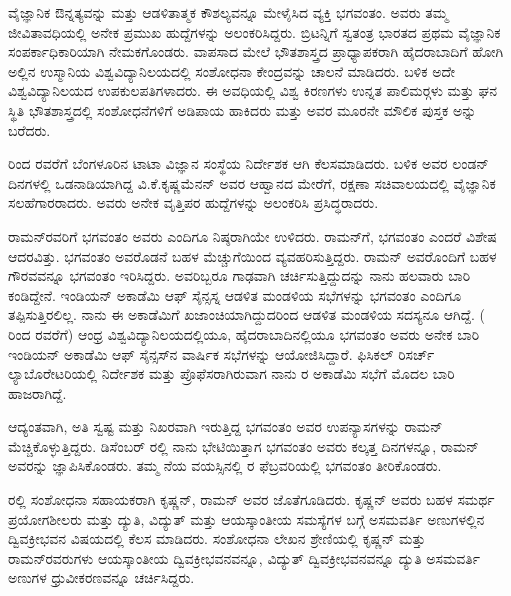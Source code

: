 \vskip 1pt

ವೈಜ್ಞಾನಿಕ ಔನ್ನತ್ಯವನ್ನು ಮತ್ತು ಆಡಳಿತಾತ್ಮಕ ಕೌಶಲ್ಯವನ್ನೂ ಮೇಳೈಸಿದ ವ್ಯಕ್ತಿ ಭಗವಂತಂ. ಅವರು ತಮ್ಮ ಜೀವಿತಾವಧಿಯಲ್ಲಿ ಅನೇಕ ಪ್ರಮುಖ ಹುದ್ದೆಗಳನ್ನು ಅಲಂಕರಿಸಿದ್ದರು. ಬ್ರಿಟನ್ನಿಗೆ ಸ್ವತಂತ್ರ ಭಾರತದ ಪ್ರಥಮ ವೈಜ್ಞಾನಿಕ ಸಂಪರ್ಕಾಧಿಕಾರಿಯಾಗಿ ನೇಮಕಗೊಂಡರು. ವಾಪಸಾದ ಮೇಲೆ ಭೌತಶಾಸ್ತ್ರದ ಪ್ರಾಧ್ಯಾಪಕರಾಗಿ ಹೈದರಾಬಾದಿಗೆ ಹೋಗಿ ಅಲ್ಲಿನ ಉಸ್ಮಾನಿಯ ವಿಶ್ವವಿದ್ಯಾ\-ನಿಲಯದಲ್ಲಿ ಸಂಶೋಧನಾ ಕೇಂದ್ರವನ್ನು ಚಾಲನೆ ಮಾಡಿದರು. ಬಳಿಕ ಅದೇ ವಿಶ್ವವಿದ್ಯಾನಿಲಯದ ಉಪಕುಲಪತಿಗಳಾದರು. ಈ ಅವಧಿಯಲ್ಲಿ ವಿಶ್ವ ಕಿರಣಗಳು ಉನ್ನತ ಪಾಲಿಮರ್‍ಗಳು ಮತ್ತು ಘನ ಸ್ಥಿತಿ ಭೌತಶಾಸ್ತ್ರದಲ್ಲಿ ಸಂಶೋಧನೆಗಳಿಗೆ ಅಡಿಪಾಯ ಹಾಕಿದರು ಮತ್ತು ಅವರ ಮೂರನೇ ಮೌಲಿಕ ಪುಸ್ತಕ \textit{} ಅನ್ನು ಬರೆದರು. 

\vskip 1pt

 ರಿಂದ  ರವರೆಗೆ ಬೆಂಗಳೂರಿನ ಟಾಟಾ ವಿಜ್ಞಾನ ಸಂಸ್ಥೆಯ ನಿರ್ದೇಶಕ ಆಗಿ ಕೆಲಸಮಾಡಿದರು. ಬಳಿಕ ಅವರ ಲಂಡನ್ ದಿನಗಳಲ್ಲಿ ಒಡನಾಡಿಯಾಗಿದ್ದ ವಿ.ಕೆ.ಕೃಷ್ಣಮೆನನ್ ಅವರ ಆಹ್ವಾನದ ಮೇರೆಗೆ, ರಕ್ಷಣಾ ಸಚಿವಾಲಯದಲ್ಲಿ ವೈಜ್ಞಾನಿಕ ಸಲಹೆಗಾರರಾದರು. ಅವರು ಅನೇಕ ವೃತ್ತಿಪರ ಹುದ್ದೆಗಳನ್ನು ಅಲಂಕರಿಸಿ ಪ್ರಸಿದ್ಧರಾದರು.

ರಾಮನ್‍ರವರಿಗೆ ಭಗವಂತಂ ಅವರು ಎಂದಿಗೂ ನಿಷ್ಠರಾಗಿಯೇ ಉಳಿದರು. ರಾಮನ್‍ಗೆ, ಭಗವಂತಂ ಎಂದರೆ ವಿಶೇಷ ಆದರವಿತ್ತು. ಭಗವಂತಂ ಅವರೊಡನೆ ಬಹಳ ಮೆಚ್ಚುಗೆಯಿಂದ ವ್ಯವಹರಿಸುತ್ತಿದ್ದರು. ರಾಮನ್ ಅವರೊಂದಿಗೆ ಬಹಳ ಗೌರವವನ್ನೂ ಭಗವಂತಂ ಇರಿಸಿದ್ದರು. ಅವರಿಬ್ಬರೂ ಗಾಢವಾಗಿ ಚರ್ಚಿಸುತ್ತಿದ್ದುದನ್ನು ನಾನು ಹಲವಾರು ಬಾರಿ ಕಂಡಿದ್ದೇನೆ. ಇಂಡಿಯನ್ ಅಕಾಡೆಮಿ ಆಫ್ ಸೈನ್ಸಸ್ನ ಆಡಳಿತ ಮಂಡಳಿಯ ಸಭೆಗಳನ್ನು ಭಗವಂತಂ ಎಂದಿಗೂ ತಪ್ಪಿಸುತ್ತಿರಲಿಲ್ಲ. ನಾನು ಈ ಅಕಾಡೆಮಿಗೆ ಖಜಾಂಚಿಯಾಗಿದ್ದುದರಿಂದ ಆಡಳಿತ ಮಂಡಳಿಯ ಸದಸ್ಯನೂ ಆಗಿದ್ದೆ. ( ರಿಂದ  ರವರೆಗೆ) ಆಂಧ್ರ ವಿಶ್ವವಿದ್ಯಾನಿಲಯದಲ್ಲಿಯೂ, ಹೈದರಾಬಾದಿನಲ್ಲಿಯೂ ಭಗವಂತಂ ಅವರು ಅನೇಕ ಬಾರಿ ಇಂಡಿಯನ್ ಅಕಾಡೆಮಿ ಆಫ್ ಸೈನ್ಸಸ್‍ನ ವಾರ್ಷಿಕ ಸಭೆಗಳನ್ನು ಆಯೋಜಿಸಿದ್ದಾರೆ. ಫಿಸಿಕಲ್ ರಿಸರ್ಚ್ ಲ್ಯಾಬೊರೇಟರಿಯಲ್ಲಿ ನಿರ್ದೇಶಕ ಮತ್ತು ಪ್ರೊಫೆಸರಾಗಿರುವಾಗ ನಾನು ರ ಅಕಾಡೆಮಿ ಸಭೆಗೆ ಮೊದಲ ಬಾರಿ ಹಾಜರಾಗಿದ್ದೆ.

ಆದ್ಯಂತವಾಗಿ, ಅತಿ ಸ್ವಷ್ಟ ಮತ್ತು ನಿಖರವಾಗಿ ಇರುತ್ತಿದ್ದ ಭಗವಂತಂ ಅವರ ಉಪನ್ಯಾಸಗಳನ್ನು ರಾಮನ್ ಮೆಚ್ಚಿಕೊಳ್ಳುತ್ತಿದ್ದರು. ಡಿಸೆಂಬರ್ ರಲ್ಲಿ ನಾನು ಭೇಟಿಯಿತ್ತಾಗ ಭಗವಂತಂ ಅವರು ಕಲ್ಕತ್ತ ದಿನಗಳನ್ನೂ, ರಾಮನ್ ಅವರನ್ನು ಜ್ಞಾಪಿಸಿಕೊಂಡರು. ತಮ್ಮ  ನೆಯ ವಯಸ್ಸಿನಲ್ಲಿ ರ ಫೆಬ್ರವರಿಯಲ್ಲಿ ಭಗವಂತಂ ತೀರಿಕೊಂಡರು.



ರಲ್ಲಿ ಸಂಶೋಧನಾ ಸಹಾಯಕರಾಗಿ ಕೃಷ್ಣನ್, ರಾಮನ್ ಅವರ ಜೊತೆಗೂಡಿದರು. ಕೃಷ್ಣನ್ ಅವರು ಬಹಳ ಸಮರ್ಥ ಪ್ರಯೋಗಶೀಲರು ಮತ್ತು ದ್ಯುತಿ, ವಿದ್ಯುತ್ ಮತ್ತು ಆಯಸ್ಕಾಂತೀಯ ಸಮಸ್ಯೆಗಳ ಬಗ್ಗೆ ಅಸಮವರ್ತಿ ಅಣುಗಳಲ್ಲಿನ ದ್ವಿವಕ್ರೀಭವನ ವಿಷಯದಲ್ಲಿ ಕೆಲಸ ಮಾಡಿದರು. ಸಂಶೋಧನಾ ಲೇಖನ ಶ್ರೇಣಿಯಲ್ಲಿ ಕೃಷ್ಣನ್ ಮತ್ತು ರಾಮನ್‍ರವರುಗಳು ಆಯಸ್ಕಾಂತೀಯ ದ್ವಿವಕ್ರೀಭವನವನ್ನೂ, ವಿದ್ಯುತ್ ದ್ವಿವಕ್ರೀಭವನವನ್ನೂ ದ್ಯುತಿ ಅಸಮವರ್ತಿ ಅಣುಗಳ ಧ್ರುವೀಕರಣ\-ವನ್ನೂ ಚರ್ಚಿಸಿದ್ದರು.

